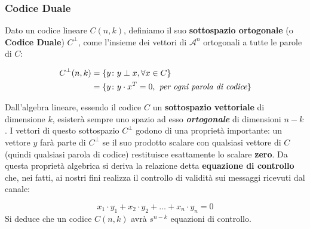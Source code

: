 \subsubsection{Codice Duale}
Dato un codice lineare $C(n,k)$, definiamo il suo \textbf{sottospazio ortogonale} (o \textbf{Codice Duale}) $C^\perp$, come l'insieme dei vettori di $\mathcal{A}^n$ ortogonali a tutte le parole di $C$:

\begin{align*}
C^\perp(n,k) &= \{y \space\colon \space y \perp x, \forall x \in C\} \\
             &= \{ y \space \colon \space y \cdot x^T = 0, \textit{ per ogni parola di codice} \}
\end{align*}

Dall'algebra lineare, essendo il codice $C$ un \textbf{sottospazio vettoriale} di dimensione $k$, esisterà sempre uno spazio ad esso \textbf{\textit{ortogonale}} di dimensioni $n-k$. I vettori di questo sottospazio $C^\perp$ godono di una proprietà importante: un vettore $y$ farà parte di $C^\perp$ se  il suo prodotto scalare con qualsiasi vettore di $C$ (quindi qualsiasi parola di codice) restituisce esattamente lo scalare \textbf{zero}.
Da questa proprietà algebrica si deriva la relazione detta \textbf{equazione di controllo} che, nei fatti, ai nostri fini realizza il controllo di validità sui messaggi ricevuti dal canale:

\[x_1 \cdot y_1 + x_2 \cdot y_2 + \dots + x_n \cdot y_n = 0\]
Si deduce che un codice $C(n,k)$ avrà $s^{n-k}$ equazioni di controllo.


